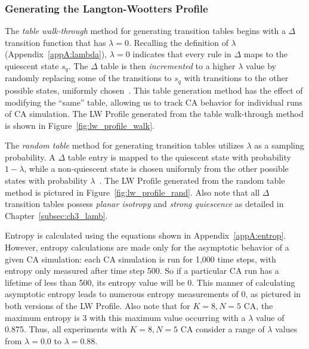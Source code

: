 \documentclass[a4paper,11pt]{article}
\begin{document}
\subsubsection*{Generating the Langton-Wootters Profile}

The \textit{table walk-through} method for generating transition tables begins with a $\Delta$ transition function that has $\lambda = 0$. Recalling the definition of $\lambda$ (Appendix~\ref{appA:lambda}), $\lambda=0$ indicates that every rule in $\Delta$ maps to the quiescent state $s_q$. The $\Delta$ table is then \textit{incremented} to a higher $\lambda$ value by randomly replacing some of the transitions to $s_q$ with transitions to the other possible states, uniformly chosen~\cite{la90}. This table generation method has the effect of modifying the ``same'' table, allowing us to track CA behavior for individual runs of CA simulation. The LW Profile generated from the table walk-through method is shown in Figure~\ref{fig:lw_profile_walk}.

The \textit{random table} method for generating transition tables utilizes $\lambda$ as a sampling probability. A $\Delta$ table entry is mapped to the quiescent state with probability $1 - \lambda$, while a non-quiescent state is chosen uniformly from the other possible states with probability $\lambda$~\cite{la90}. The LW Profile generated from the random table method is pictured in Figure~\ref{fig:lw_profile_rand}. Also note that all $\Delta$ transition tables possess \textit{planar isotropy} and \textit{strong quiescence} as detailed in Chapter~\ref{subsec:ch3_lamb}.

Entropy is calculated using the equations shown in Appendix~\ref{appA:entrop}. However, entropy calculations are made only for the asymptotic behavior of a given CA simulation: each CA simulation is run for 1,000 time steps, with entropy only measured after time step 500. So if a particular CA run has a lifetime of less than 500, its entropy value will be 0. This manner of calculating asymptotic entropy leads to numerous entropy measurements of 0, as pictured in both versions of the LW Profile. Also note that for $K=8, N=5$ CA, the maximum entropy is 3 with this maximum value occurring with a $\lambda$ value of 0.875. Thus, all experiments with $K=8, N=5$ CA consider a range of $\lambda$ values from $\lambda = 0.0$ to $\lambda = 0.88$.
\end{document}
